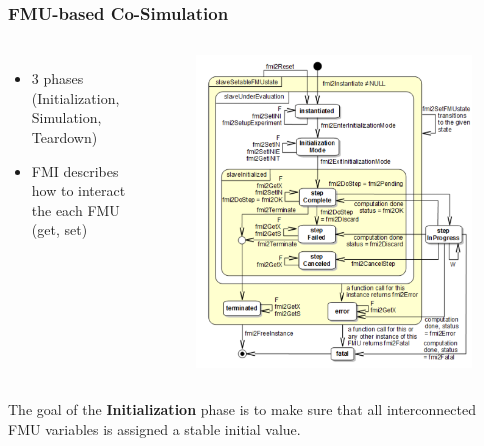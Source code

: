 \documentclass{beamer}
\begin{document}
\begin{frame}
\frametitle{FMU-based Co-Simulation}
\begin{columns}
\begin{itemize}
    \item 3 phases (Initialization, Simulation, Teardown)
    \item FMI describes how to interact the each FMU (get, set)
\end{itemize}
\begin{figure}
    \centering
    \includegraphics[scale=0.3]{images/Screenshot 2020-09-09 at 08.38.44.png}
\end{figure}
\end{columns}

The goal of the \textbf{Initialization} phase is to make sure that all interconnected FMU variables is assigned a stable initial value. 

\end{frame}
\end{document}
